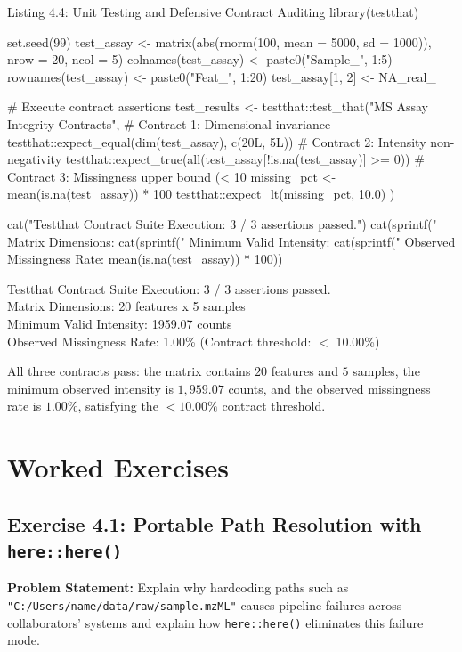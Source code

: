 \documentclass[11pt,twoside,openright]{book}
\begin{document}
\begin{rchunk}{Listing 4.4: Unit Testing and Defensive Contract Auditing}
library(testthat)

set.seed(99)
test_assay <- matrix(abs(rnorm(100, mean = 5000, sd = 1000)), nrow = 20, ncol = 5)
colnames(test_assay) <- paste0("Sample_", 1:5)
rownames(test_assay) <- paste0("Feat_", 1:20)
test_assay[1, 2] <- NA_real_

# Execute contract assertions
test_results <- testthat::test_that("MS Assay Integrity Contracts", {
  # Contract 1: Dimensional invariance
  testthat::expect_equal(dim(test_assay), c(20L, 5L))
  # Contract 2: Intensity non-negativity
  testthat::expect_true(all(test_assay[!is.na(test_assay)] >= 0))
  # Contract 3: Missingness upper bound (< 10%
  missing_pct <- mean(is.na(test_assay)) * 100
  testthat::expect_lt(missing_pct, 10.0)
})

cat("Testthat Contract Suite Execution: 3 / 3 assertions passed.\n")
cat(sprintf("  Matrix Dimensions: %
cat(sprintf("  Minimum Valid Intensity: %
cat(sprintf("  Observed Missingness Rate: %
            mean(is.na(test_assay)) * 100))
\end{rchunk}

\begin{routput}
Testthat Contract Suite Execution: 3 / 3 assertions passed.\\
\enspace\enspace Matrix Dimensions: 20 features x 5 samples\\
\enspace\enspace Minimum Valid Intensity: 1959.07 counts\\
\enspace\enspace Observed Missingness Rate: 1.00\% (Contract threshold: $<$ 10.00\%)
\end{routput}

All three contracts pass: the matrix contains $20$ features and $5$ samples, the minimum observed intensity is $1{,}959.07$ counts, and the observed missingness rate is $1.00\%$, satisfying the $< 10.00\%$ contract threshold.

\FloatBarrier
\section{Worked Exercises}
\label{sec:worked_exercises}

\subsection*{Exercise 4.1: Portable Path Resolution with \texttt{here::here()}}
\noindent\textbf{Problem Statement:}\enspace
Explain why hardcoding paths such as \texttt{"C:/Users/name/data/raw/sample.mzML"} causes pipeline failures across collaborators' systems and explain how \texttt{here::here()} eliminates this failure mode.
\end{document}
